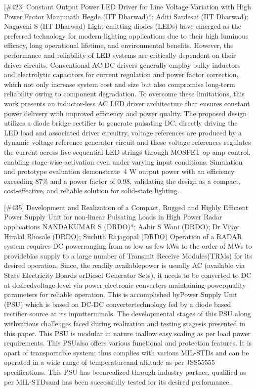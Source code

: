 {} \begin{abstract_online} {[\#423] Constant Output Power LED Driver for Line Voltage Variation with High Power Factor} {} {Manjunath Hegde (IIT Dharwad)*; Aditi Sardesai (IIT Dharwad); Nagaveni S (IIT Dharwad)} {} Light-emitting diodes (LEDs) have emerged as the preferred technology for modern lighting applications due to their high luminous efficacy, long operational lifetime, and environmental benefits. However, the performance and reliability of LED systems are critically dependent on their driver circuits. Conventional AC-DC drivers generally employ bulky inductors and electrolytic capacitors for current regulation and power factor correction, which not only increase system cost and size but also compromise long-term reliability owing to component degradation. To overcome these limitations, this work presents an inductor-less AC LED driver architecture that ensures constant power delivery with improved efficiency and power quality. The proposed design utilizes a diode bridge rectifier to generate pulsating DC, directly driving the LED load and associated driver circuitry, voltage references are produced by a dynamic voltage reference generator circuit and these voltage references regulates the current across five sequential LED strings through MOSFET op-amp control, enabling stage-wise activation even under varying input conditions. Simulation and prototype evaluation demonstrate $~$4 W output power with an efficiency exceeding 87\% and a power factor of 0.98, validating the design as a compact, cost-effective, and reliable solution for solid-state lighting. \end{abstract_online} 
{} \begin{abstract_online} {[\#435] Development and Realization of a Compact, Rugged and Highly Efficient Power Supply Unit for non-linear Pulsating Loads in High Power Radar applications} {} {NANDAKUMAR S (DRDO)*; Aabir  S Wani (DRDO); Dr Vijay Hiralal Bhosale (DRDO); Suchith Rajagopal (DRDO)} {} Operation of a RADAR system requires DC powerranging from as low as few kWs to the order of MWs to providebias supply to a large number of Transmit Receive Modules(TRMs) for its desired operation. Since, the readily availablepower is usually AC (available via State Electricity Boards orDiesel Generator Sets), it needs to be converted to DC at desiredvoltage level via power electronic converters maintaining powerquality parameters for reliable operation. This is accomplished byPower Supply Unit (PSU) which is based on DC-DC convertertechnology fed by a diode based rectifier source at its inputterminals. The developmental stages of this PSU along withvarious challenges faced during realization and testing stagesis presented in this paper. This PSU is modular in nature toallow easy scaling as per load power requirements. This PSUalso offers various functional and protection features. It is apart of transportable system; thus complies with various MIL-STDs and can be operated in a wide range of temperatureand altitude as per JSS55555 specifications. This PSU has beenrealized through industry partner, qualified as per MIL-STDsand has been successfully tested for its desired performance. \end{abstract_online} 
